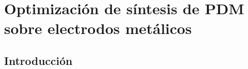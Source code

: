  \newcommand{\NoBiblioMeso}[1]{
 \ifthenelse{\equal{#1}{verdadero}}{}{}
 \NoBiblioMeso{verdadero}}

 
 \FormatoCapituloDosLineas
 
\chapter{Optimización de síntesis de PDM sobre electrodos metálicos}
 \label{chap:Mesoporosos}

 \thispagestyle{empty}
	
 
 \vfill
 \minitoc
 \newpage

\section{Introducción}

